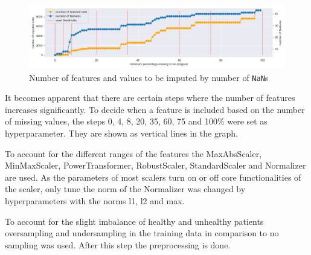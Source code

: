 \begin{figure}[h]
	\centering
	\includegraphics[width=\textwidth]{images/percentageToBeDropped.png}
	\caption{Number of features and values to be imputed by number of \texttt{NaN}s}
	\label{fig:percentageToBeDropped}
\end{figure}

It becomes apparent that there are certain steps where the number of features increases significantly. To decide when a feature is included based on the number of missing values, the steps 0, 4, 8, 20, 35, 60, 75 and 100\% were set as hyperparameter. They are shown as vertical lines in the graph. 

To account for the different ranges of the features the MaxAbsScaler, MinMaxScaler, PowerTransformer, RobustScaler, StandardScaler and Normalizer are used. As the parameters of most scalers turn on or off core functionalities of the scaler, only tune the norm of the Normalizer was changed by hyperparameters with the norms l1, l2 and max.

To account for the slight imbalance of healthy and unhealthy patients oversampling and undersampling in the training data in comparison to no sampling was used. After this step the preprocessing is done. 


